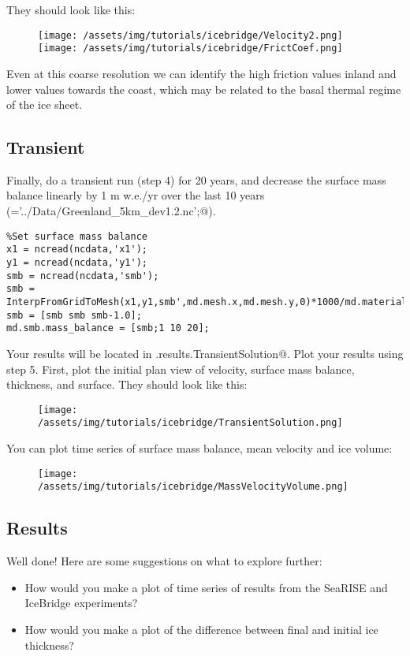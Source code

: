 They should look like this:
\begin{figure}[H]
	\begin{center}
		\texttt{[image: /assets/img/tutorials/icebridge/Velocity2.png]}
		\texttt{[image: /assets/img/tutorials/icebridge/FrictCoef.png]}
	\end{center}
\end{figure}
Even at this coarse resolution we can identify the high friction values inland and lower values towards the coast, which may be related to the basal thermal regime of the ice sheet.

\subsection{Transient} %
Finally, do a transient run (step 4) for 20 years, and decrease the surface mass balance linearly by 1 m w.e./yr over the last 10 years (\verb@ncdata='../Data/Greenland_5km_dev1.2.nc';@).
\begin{verbatim}%Set surface mass balance
x1 = ncread(ncdata,'x1');
y1 = ncread(ncdata,'y1');
smb = ncread(ncdata,'smb');
smb = InterpFromGridToMesh(x1,y1,smb',md.mesh.x,md.mesh.y,0)*1000/md.materials.rho_ice;
smb = [smb smb smb-1.0];
md.smb.mass_balance = [smb;1 10 20];\end{verbatim}

Your results will be located in \verb@md.results.TransientSolution@. Plot your results using step 5. First, plot the initial plan view of velocity, surface mass balance, thickness, and surface. They should look like this:
\begin{figure}[H]
	\begin{center}
		\texttt{[image: /assets/img/tutorials/icebridge/TransientSolution.png]}
	\end{center}
\end{figure}
You can plot time series of surface mass balance, mean velocity and ice volume:
\begin{figure}[H]
	\begin{center}
		\texttt{[image: /assets/img/tutorials/icebridge/MassVelocityVolume.png]}
	\end{center}
\end{figure}

\subsection{Results} %
Well done! Here are some suggestions on what to explore further:
\begin{itemize}
	\item How would you make a plot of time series of results from the SeaRISE and IceBridge experiments?
	\item How would you make a plot of the difference between final and initial ice thickness?
\end{itemize}

